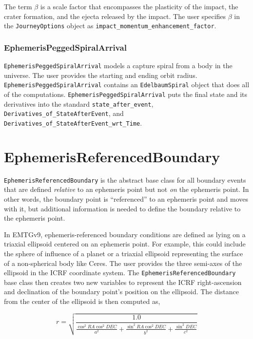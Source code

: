 The term $\beta$ is a scale factor that encompasses the plasticity of the impact, the crater formation, and the ejecta released by the impact. The user specifies $\beta$ in the \texttt{JourneyOptions} object as \texttt{impact\_momentum\_enhancement\_factor}.

\subsubsection{EphemerisPeggedSpiralArrival}
\label{subsubsec:EphemerisPeggedSpiralArrival}

\texttt{EphemerisPeggedSpiralArrival} models a capture spiral from a body in the universe. The user provides the starting and ending orbit radius. \texttt{EphemerisPeggedSpiralArrival} contains an \texttt{EdelbaumSpiral} object that does all of the computations. \texttt{EphemerisPeggedSpiralArrival} puts the final state and its derivatives into the standard \texttt{state\_after\_event}, \texttt{Derivatives\_of\_StateAfterEvent}, and \texttt{Derivatives\_of\_StateAfterEvent\_wrt\_Time}.

\section{EphemerisReferencedBoundary}
\label{sec:ephemerisreferencedboundary}

\texttt{EphemerisReferencedBoundary} is the abstract base class for all boundary events that are defined \textit{relative} to an ephemeris point but not \textit{on} the ephemeris point. In other words, the boundary point is ``referenced'' to an ephemeris point and moves with it, but additional information is needed to define the boundary relative to the ephemeris point.

In EMTGv9, ephemeris-referenced boundary conditions are defined as lying on a triaxial ellipsoid centered on an ephemeris point. For example, this could include the sphere of influence of a planet or a triaxial ellipsoid representing the surface of a non-spherical body like Ceres. The user provides the three semi-axes of the ellipsoid in the \ac{ICRF} coordinate system. The \texttt{EphemerisReferencedBoundary} base class then creates two new variables to represent the \ac{ICRF} right-ascension and declination of the boundary point's position on the ellipsoid. The distance from the center of the ellipsoid is then computed as,

\begin{equation}
	\label{eq:trixial_ellipsoid}
	r = \sqrt{\frac{1.0}{\frac{\cos^2 RA \cos^2 DEC}{a^2} + \frac{\sin^2 RA \cos^2 DEC}{b^2} + \frac{\sin^2 DEC}{c^2}}}
\end{equation}

